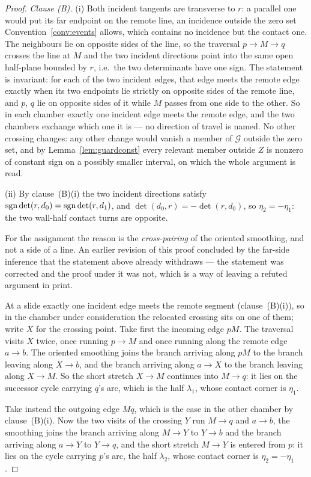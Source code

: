 \begin{proof}
\emph{Clause (B).} (i) Both incident tangents are transverse to $r$: a parallel one would put its far
endpoint on the remote line, an incidence outside the zero set
Convention~\ref{conv:events} allows, which contains no incidence but the
contact one. The neighbours lie on opposite sides of
the line, so the traversal $p\to M\to q$ crosses the line at $M$ and the two
incident directions point into the same open half-plane bounded by $r$, i.e.\
the two determinants have one sign. The statement is invariant: for each of the two incident edges, that edge meets
the remote edge exactly when its two endpoints lie strictly on opposite sides of
the remote line, and $p$, $q$ lie on opposite sides of it while $M$ passes from
one side to the other. So in each chamber exactly one incident edge meets the
remote edge, and the two chambers exchange which one it is --- no direction of
travel is named. No other crossing changes: any other change would vanish a
member of $\mathcal G$ outside the zero set, and by
Lemma~\ref{lem:guardconst} every relevant member outside $Z$ is nonzero of
constant sign on a possibly smaller interval, on which the whole argument is
read.

(ii) By clause~(B)(i) the two incident directions satisfy
$\operatorname{sgn}\det(r,d_0)=\operatorname{sgn}\det(r,d_1)$, and $\det(d_0,r)=-\det(r,d_0)$, so
$\eta_2=-\eta_1$: the two wall-half contact turns are opposite.

For the assignment the reason is the \emph{cross-pairing} of the oriented
smoothing, and not a side of a line. An earlier revision of this proof concluded
by the far-side inference that the statement above already withdraws --- the
statement was corrected and the proof under it was not, which is a way of
leaving a refuted argument in print.

At a slide exactly one incident edge meets the remote segment
(clause~(B)(i)), so in the chamber under consideration the
relocated crossing sits on one of them; write $X$ for the crossing point. Take
first the incoming edge $pM$. The traversal visits $X$ twice, once running
$p\to M$ and once running along the remote edge $a\to b$. The oriented smoothing
joins the branch arriving along $pM$ to the branch leaving along $X\to b$, and
the branch arriving along $a\to X$ to the branch leaving along $X\to M$. So the
short stretch $X\to M$ continues into $M\to q$: it lies on the successor cycle
carrying $q$'s arc, which is the half $\lambda_1$, whose contact corner is
$\eta_1$.

Take instead the outgoing edge $Mq$, which is the case in the other chamber by
clause~(B)(i). Now the two visits of the crossing $Y$ run $M\to q$
and $a\to b$, the smoothing joins the branch arriving along $M\to Y$ to
$Y\to b$ and the branch arriving along $a\to Y$ to $Y\to q$, and the short
stretch $M\to Y$ is entered from $p$: it lies on the cycle carrying $p$'s arc,
the half $\lambda_2$, whose contact corner is $\eta_2=-\eta_1$.


\end{proof}
